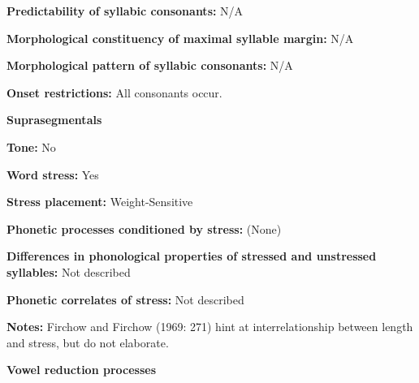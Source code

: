 \begin{styleBody}
\textbf{Predictability of syllabic consonants:} N/A
\end{styleBody}

\begin{styleBody}
\textbf{Morphological constituency of maximal syllable margin:} N/A
\end{styleBody}

\begin{styleBody}
\textbf{Morphological pattern of syllabic consonants:} N/A
\end{styleBody}

\begin{styleBody}
\textbf{Onset restrictions: }All consonants occur.
\end{styleBody}

\begin{styleBody}
\textbf{Suprasegmentals}
\end{styleBody}

\begin{styleBody}
\textbf{Tone:} No
\end{styleBody}

\begin{styleBody}
\textbf{Word stress:} Yes
\end{styleBody}

\begin{styleBody}
\textbf{Stress placement:} Weight-Sensitive
\end{styleBody}

\begin{styleBody}
\textbf{Phonetic processes conditioned by stress:} (None)
\end{styleBody}

\begin{styleBody}
\textbf{Differences in phonological properties of stressed and unstressed syllables:} Not described
\end{styleBody}

\begin{styleBody}
\textbf{Phonetic correlates of stress: }Not described
\end{styleBody}

\begin{styleBody}
\textbf{Notes: }Firchow and Firchow (1969: 271) hint at interrelationship between length and stress, but do not elaborate.
\end{styleBody}

\begin{styleBody}
\textbf{Vowel reduction processes}
\end{styleBody}

